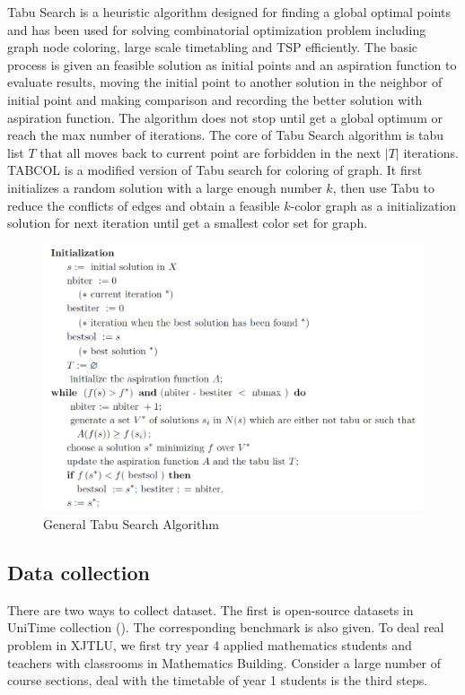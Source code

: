 \documentclass{article}
\begin{document}
Tabu Search is a heuristic algorithm designed for finding a global optimal points and has been used for solving combinatorial optimization problem including graph node coloring, large scale timetabling and TSP efficiently. The basic process is given an feasible solution as initial points and an aspiration function to evaluate results, moving the initial point to another solution in the neighbor of initial point and making comparison and recording the better solution with aspiration function. The algorithm does not stop until get a global optimum or reach the max number of iterations. The core of Tabu Search algorithm is tabu list $T$ that all moves back to current point are forbidden in the next $|T|$ iterations. TABCOL\citep{(hertz1987)using} is a modified version of Tabu search for coloring of graph. It first initializes a random solution with a large enough number $k$, then use Tabu to reduce the conflicts of edges and obtain a feasible $k$-color graph as a initialization solution for next iteration until get a smallest color set for graph.


\begin{figure}[h]
	\centering
	\includegraphics[width=0.8\linewidth]{fig3.png}
	\caption{General Tabu Search Algorithm \citep{(hertz1991)tabu}}
\end{figure}

\subsection{Data collection}

There are two ways to collect dataset. The first is open-source datasets in UniTime collection (). The corresponding benchmark is also given. To deal real problem in XJTLU, we first try year 4 applied mathematics students and teachers with classrooms in Mathematics Building. Consider a large number of course sections, deal with the timetable of year 1 students is the third steps.
\end{document}
